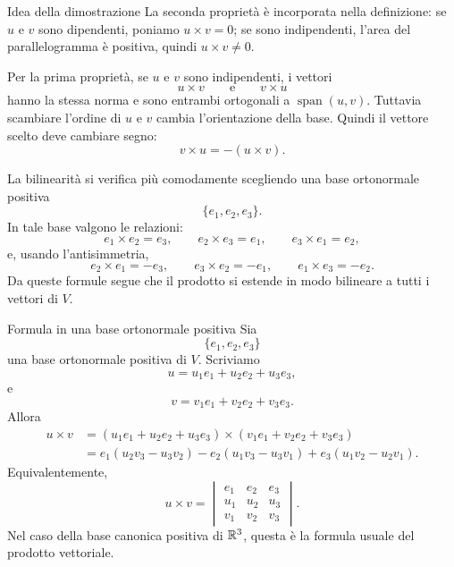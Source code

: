 \documentclass[a4paper]{article}
\begin{document}
\begin{snippetproof}{Idea della dimostrazione}
    La seconda proprietà è incorporata nella definizione: se \(u\) e \(v\) sono dipendenti, poniamo \(u\times v=0\); se sono indipendenti, l'area del parallelogramma è positiva, quindi \(u\times v\neq 0\).

    Per la prima proprietà, se \(u\) e \(v\) sono indipendenti, i vettori
    \[
        u\times v
        \qquad
        \text{e}
        \qquad
        v\times u
    \]
    hanno la stessa norma e sono entrambi ortogonali a \(\operatorname{span}(u,v)\). Tuttavia scambiare l'ordine di \(u\) e \(v\) cambia l'orientazione della base. Quindi il vettore scelto deve cambiare segno:
    \[
        v\times u=-(u\times v).
    \]

    La bilinearità si verifica più comodamente scegliendo una base ortonormale positiva
    \[
        \{e_1,e_2,e_3\}.
    \]
    In tale base valgono le relazioni:
    \[
        e_1\times e_2=e_3,
        \qquad
        e_2\times e_3=e_1,
        \qquad
        e_3\times e_1=e_2,
    \]
    e, usando l'antisimmetria,
    \[
        e_2\times e_1=-e_3,
        \qquad
        e_3\times e_2=-e_1,
        \qquad
        e_1\times e_3=-e_2.
    \]
    Da queste formule segue che il prodotto si estende in modo bilineare a tutti i vettori di \(V\).
\end{snippetproof}

\begin{snippetexample}{Formula in una base ortonormale positiva}
    Sia
    \[
        \{e_1,e_2,e_3\}
    \]
    una base ortonormale positiva di \(V\). Scriviamo
    \[
        u=u_1e_1+u_2e_2+u_3e_3,
    \]
    e
    \[
        v=v_1e_1+v_2e_2+v_3e_3.
    \]
    Allora
    \begin{align*}
        u\times v
        &=
        (u_1e_1+u_2e_2+u_3e_3)
        \times
        (v_1e_1+v_2e_2+v_3e_3)\\
        &=
        e_1(u_2v_3-u_3v_2)
        -
        e_2(u_1v_3-u_3v_1)
        +
        e_3(u_1v_2-u_2v_1).
    \end{align*}
    Equivalentemente,
    \[
        u\times v
        =
        \begin{vmatrix}
            e_1 & e_2 & e_3\\
            u_1 & u_2 & u_3\\
            v_1 & v_2 & v_3
        \end{vmatrix}.
    \]
    Nel caso della base canonica positiva di \(\mathbb{R}^3\), questa è la formula usuale del prodotto vettoriale.
\end{snippetexample}
\end{document}
